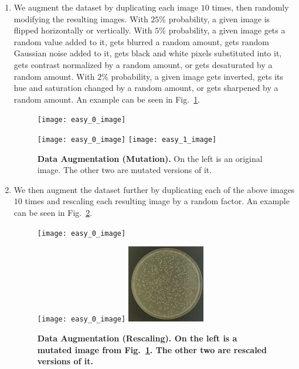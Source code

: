 \documentclass[10pt,letterpaper]{article}
\begin{document}
            \begin{enumerate}
                \item
                    We augment the dataset by duplicating each image $10$ times, then randomly modifying the resulting images. With $25\%$ probability, a given image is flipped horizontally or vertically. With $5\%$ probability, a given image gets a random value added to it, gets blurred a random amount, gets random Gaussian noise added to it, gets black and white pixels substituted into it, gets contrast normalized by a random amount, or gets desaturated by a random amount. With $2\%$ probability, a given image gets inverted, gets its hue and saturation changed by a random amount, or gets sharpened by a random amount. An example can be seen in Fig.~\ref{dcnn_augmentation_mutation}.
        
                \begin{figure}[h]
                    \graphicspath{{results/preprocess_masked/figures/original/}}
                    \texttt{[image: easy\_0\_image]}
                    \graphicspath{{results/preprocess_masked/figures/augmented/}}
                    \texttt{[image: easy\_0\_image]}
                    \texttt{[image: easy\_1\_image]}
                    \caption{{\bf Data Augmentation (Mutation).} On the left is an original image. The other two are mutated versions of it.}
                    \label{dcnn_augmentation_mutation}
                \end{figure}
    
            \item
                We then augment the dataset further by duplicating each of the above images $10$ times and rescaling each resulting image by a random factor. An example can be seen in Fig.~\ref{dcnn_augmentation_rescaling}.
    
                \begin{figure}[h]
                    \graphicspath{{results/preprocess_masked/figures/augmented/}}
                    \texttt{[image: easy\_0\_image]}
                    \graphicspath{{results/preprocess_masked/figures/resized/}}
                    \texttt{[image: easy\_0\_image]}
                    \includegraphics[width=0.32\textwidth,resolution=300]{easy_80_image}
                    \caption{{\bf Data Augmentation (Rescaling). On the left is a mutated image from Fig.~\ref{dcnn_augmentation_mutation}. The other two are rescaled versions of it.}}
                    \label{dcnn_augmentation_rescaling}
                \end{figure}


\end{enumerate}
\end{document}
